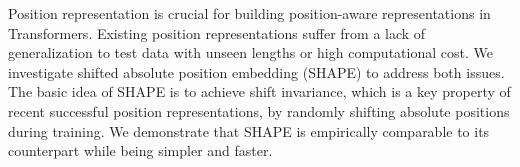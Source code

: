 Position representation is crucial for building position-aware representations in Transformers. Existing position representations suffer from a lack of generalization to test data with unseen lengths or high computational cost. We investigate shifted absolute position embedding (SHAPE) to address both issues. The basic idea of SHAPE is to achieve shift invariance, which is a key property of recent successful position representations, by randomly shifting absolute positions during training. We demonstrate that SHAPE is empirically comparable to its counterpart while being simpler and faster.
